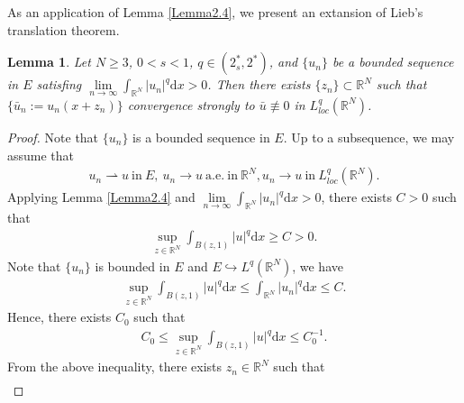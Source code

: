\documentclass[12pt,a4paper,reqno]{amsart}
\numberwithin{equation}{section}
\newtheorem{lemma}{Lemma}[section]
\begin{document}
As an application of Lemma \ref{Lemma2.4}, we present an extansion of Lieb's translation theorem.

\begin{lemma}\label{Lemma2.5}
Let $N\geqslant3$, $0<s<1$, $q\in (2^{*}_{s},2^{*})$, and $\{u_{n}\}$ be a bounded sequence in $E$ satisfing  $\lim\limits_{n\to\infty}\int_{\mathbb{R}^{N}}|u_{n}|^{q}\mathrm{d}x>0$.
Then there exists $\{z_{n}\}\subset \mathbb{R}^{N}$ such that $\{\bar{u}_{n}:=u_{n}(x+z_{n})\}$ convergence strongly to $\bar{u}\not\equiv0$ in $L^{q}_{loc}(\mathbb{R}^{N})$.
\end{lemma}


\begin{proof}
Note that $\{u_{n}\}$ is a bounded sequence in $E$.
Up to a subsequence,
we may assume that
\begin{equation*}
\begin{aligned}
u_{n}\rightharpoonup u
~
\mathrm{in}
~
E,~
u_{n}\rightarrow u
~
\mathrm{a.e. ~in}
~\mathbb{R}^{N},
u_{n}\rightarrow u
~
\mathrm{in}
~
L^{q}_{loc}(\mathbb{R}^{N}).
\end{aligned}
\end{equation*}
Applying Lemma \ref{Lemma2.4} and $\lim\limits_{n\to\infty}\int_{\mathbb{R}^{N}}|u_{n}|^{q}\mathrm{d}x>0$,
there exists
$C>0$
such that
\begin{equation*}
\begin{aligned}
\sup_{z\in \mathbb{R}^{N}}
\int_{B(z,1)}
|u|^{q}
\mathrm{d}x\geqslant C>0.
\end{aligned}
\end{equation*}
Note that $\{u_{n}\}$ is bounded in $E$ and $E\hookrightarrow L^{q}(\mathbb{R}^{N})$,
we have
\begin{equation*}
\begin{aligned}
\sup_{z\in \mathbb{R}^{N}}
\int_{B(z,1)}
|u|^{q}
\mathrm{d}x\leqslant\int_{\mathbb{R}^{N}}
|u_{n}|^{q}
\mathrm{d}x \leqslant C.
\end{aligned}
\end{equation*}
Hence, there exists $C_{0}$ such that
\begin{equation*}
\begin{aligned}
C_{0}
\leqslant
\sup_{z\in \mathbb{R}^{N}}
\int_{B(z,1)}
|u|^{q}
\mathrm{d}x\leqslant C_{0}^{-1}.
\end{aligned}
\end{equation*}
From the above inequality,
there exists
$z_{n}\in \mathbb{R}^{N}$
such that
\begin{equation*}
\begin{aligned}

\end{aligned}
\end{equation*}
\end{proof}
\end{document}
